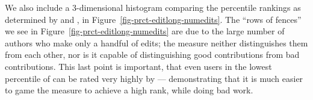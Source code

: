 We also include a 3-dimensional histogram comparing the
percentile rankings as determined by \editlong and \numedits,
in Figure~\ref{fig-prct-editlong-numedits}.
The ``rows of fences'' we see
in Figure~\ref{fig-prct-editlong-numedits}
are due to the large number of authors who
make only a handful of edits; the \numedits measure
neither distinguishes them from each other,
nor is it capable of distinguishing good contributions from
bad contributions.
This last point is important, that even users in
the lowest percentile of \editlong can be rated
very highly by \numedits --- demonstrating
that it is much easier to game the \numedits
measure to achieve a high rank, while doing bad work.
%

